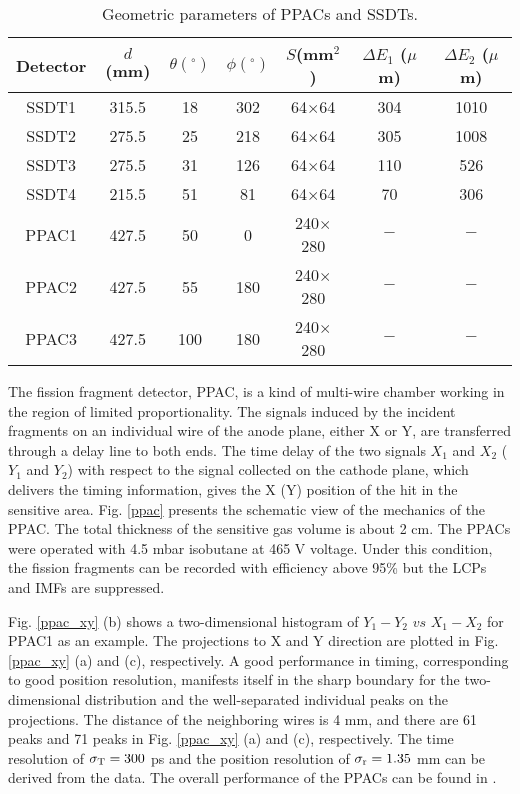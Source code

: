\documentclass[submitting]{nst}
\begin{document}
\begin{table} [!htb]
	\label{tab:cee_para}
	\caption{Geometric parameters of PPACs and SSDTs.}
	\begin{center}%
		\begin{tabular}%
			{ccccccc}\toprule[0.65pt]  
			\hline 
			Detector & $d$(mm) & $\theta(^{\circ})$ & $\phi(^{\circ})$ & $S$(mm$^2$)  &$\Delta E_1$ ($\mu$m) & $\Delta E_2$ ($\mu$m) \\
			\hline
			SSDT1  & 315.5 & 18 & 302 & 64$\times$64  & 304 & 1010\\
			SSDT2  & 275.5 & 25 & 218 & 64$\times$64  & 305 & 1008\\
			SSDT3  & 275.5 & 31 & 126 & 64$\times$64  & 110 & 526\\
			SSDT4  & 215.5 & 51 & 81 & 64$\times$64  & 70 & 306\\
			PPAC1  & 427.5 & 50 & 0 & 240$\times$280 &$-$&$-$\\
			PPAC2  & 427.5 & 55 & 180 & 240$\times$280&$-$ &$-$ \\
			PPAC3  & 427.5 & 100 & 180 & 240$\times$280& $-$&$-$\\

			\hline \bottomrule[0.5pt]
		\end{tabular}
	\end{center}
\end{table}
\vspace*{-2mm}

The fission fragment detector,  PPAC, is a kind of   multi-wire chamber working in the region of limited proportionality. The signals induced by the incident fragments on an individual wire of the anode plane, either X or Y, are transferred through a delay line to both ends. The time delay of the two signals $X_1$ and $X_2$ ($Y_1$ and $Y_2$)  with respect to the signal collected on the cathode plane, which delivers the timing information,  gives the X (Y) position of the hit in the sensitive area. Fig. \ref{ppac} presents the schematic view of the mechanics of the PPAC.  The total thickness of the sensitive gas volume is about 2 cm. The PPACs were operated with 4.5 mbar isobutane at 465 V voltage. Under this condition, the fission fragments can be recorded with efficiency above 95\% but the LCPs and IMFs are suppressed.


Fig. \ref{ppac_xy} (b) shows a two-dimensional histogram of $Y_1-Y_2$ $vs$ $X_1-X_2$  for PPAC1 as an example. The projections to X and Y direction are plotted in Fig. \ref{ppac_xy} (a) and (c), respectively. A good performance in timing, corresponding to good position resolution, manifests itself in the sharp boundary for the two-dimensional distribution and the well-separated individual peaks on the projections. The distance of the neighboring wires is 4 mm, and there are 61 peaks and 71 peaks in Fig. \ref{ppac_xy} (a) and (c), respectively. The time resolution of $\sigma_{\rm T} = 300$ ps and the position resolution of $\sigma_{\rm r}=1.35$ mm can be derived from the data. The overall performance of the PPACs can be found in  \cite{Weixl2020}.
\end{document}
